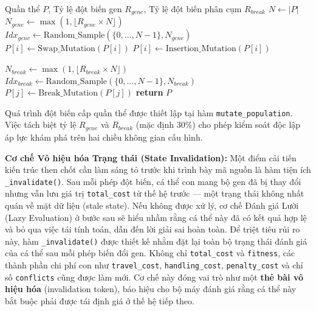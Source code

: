\documentclass[12pt,a4paper]{article}
\numberwithin{figure}{subsection}
\newcounter{breakablealgocounter}
\newenvironment{breakablealgorithm}[1]
{
    \refstepcounter{breakablealgocounter}
    \begin{tcolorbox}[
        breakable,
        enhanced,
        colback=white,
        colframe=black!55,
        sharp corners,
        boxrule=0.5pt,
        left=2mm,
        right=2mm,
        top=1mm,
        bottom=1mm,
        title={Algorithm \thebreakablealgocounter. #1},
        fonttitle=\bfseries
    ]
}
{
    \end{tcolorbox}
}
\begin{document}
\begin{breakablealgorithm}{Chiến lược Đột biến Kép (Dual-Mutation Strategy)}
\label{alg:dual_mutation}
\begin{algorithmic}[1]
\Require Quần thể $P$, Tỷ lệ đột biến gen $R_{gene}$, Tỷ lệ đột biến phân cụm $R_{break}$
\State $N \gets |P|$
\State $N_{gene} \gets \max(1, \lfloor R_{gene} \times N \rfloor)$
\State $Idx_{gene} \gets \text{Random\_Sample}(\{0, \dots, N-1\}, N_{gene})$
        \State $P[i] \gets \text{Swap\_Mutation}(P[i])$
    \Else
        \State $P[i] \gets \text{Insertion\_Mutation}(P[i])$
    \EndIf
\EndFor

\State $N_{break} \gets \max(1, \lfloor R_{break} \times N \rfloor)$
\State $Idx_{break} \gets \text{Random\_Sample}(\{0, \dots, N-1\}, N_{break})$
    \State $P[j] \gets \text{Break\_Mutation}(P[j])$ 
\EndFor
\State \textbf{return} $P$
\end{algorithmic}
\end{breakablealgorithm}

Quá trình đột biến cấp quần thể được thiết lập tại hàm \texttt{mutate\_population}. Việc tách biệt tỷ lệ $R_{gene}$ và $R_{break}$ (mặc định $30\%$) cho phép kiểm soát độc lập áp lực khám phá trên hai chiều không gian cấu hình.

\textbf{Cơ chế Vô hiệu hóa Trạng thái (State Invalidation):} Một điểm cải tiến kiến trúc then chốt cần làm sáng tỏ trước khi trình bày mã nguồn là hàm tiện ích \texttt{\_invalidate()}. Sau mỗi phép đột biến, cá thể con mang bộ gen đã bị thay đổi nhưng vẫn lưu giá trị \texttt{total\_cost} từ thế hệ trước — một trạng thái không nhất quán về mặt dữ liệu (stale state). Nếu không được xử lý, cơ chế Đánh giá Lười (Lazy Evaluation) ở bước sau sẽ hiểu nhầm rằng cá thể này đã có kết quả hợp lệ và bỏ qua việc tái tính toán, dẫn đến lời giải sai hoàn toàn. Để triệt tiêu rủi ro này, hàm \texttt{\_invalidate()} được thiết kế nhằm đặt lại toàn bộ trạng thái đánh giá của cá thể sau mỗi phép biến đổi gen. Không chỉ \texttt{total\_cost} và \texttt{fitness}, các thành phần chi phí con như \texttt{travel\_cost}, \texttt{handling\_cost}, \texttt{penalty\_cost} và chỉ số \texttt{conflicts} cũng được làm mới. Cơ chế này đóng vai trò như một \textbf{thẻ bài vô hiệu hóa} (invalidation token), báo hiệu cho bộ máy đánh giá rằng cá thể này bắt buộc phải được tái định giá ở thế hệ tiếp theo.
\end{document}
